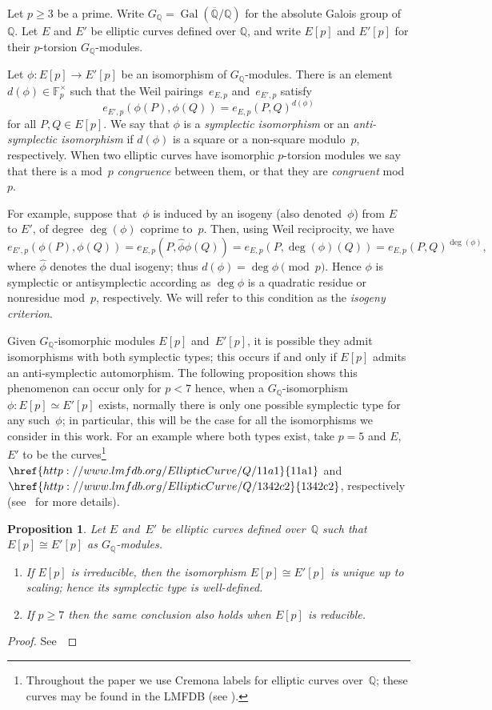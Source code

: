 \documentclass[12pt]{amsart}
\newcommand{\lmfdbec}[3]{\href{http://www.lmfdb.org/EllipticCurve/Q/#1#2#3}{{\text{\rm#1#2#3}}}}
\newcommand{\F}{\mathbb{F}}
\newcommand{\Q}{\mathbb{Q}}
\newcommand{\Qbar}{{\overline{\Q}}}
\DeclareMathOperator{\Gal}{Gal}
\numberwithin{equation}{section}
\newtheorem{proposition}[theorem]{Proposition}
\theoremstyle{definition}
\theoremstyle{remark}
\begin{document}
Let $p \geq 3$ be a prime. Write $G_\Q = \Gal(\Qbar/\Q)$ for the
absolute Galois group of $\Q$.  Let $E$ and $E'$ be elliptic curves defined over $\Q$, and write $E[p]$ and $E'[p]$ for their $p$-torsion $G_\Q$-modules.

Let $\phi : E[p] \to E'[p]$ be an isomorphism of $G_\Q$-modules.
There is an element $d(\phi) \in \F_p^\times$ such that the Weil 
pairings~$e_{E,p}$ and~$e_{E',p}$ satisfy
\[
e_{E',p}(\phi(P), \phi(Q)) = e_{E,p}(P, Q)^{d(\phi)}
\]
for all $P, Q \in E[p]$.  We say that $\phi$ is a {\em symplectic
  isomorphism} or an {\em anti-symplectic isomorphism} if $d(\phi)$ is
a square or a non-square modulo~$p$, respectively.  When two elliptic
curves have isomorphic $p$-torsion modules we say that there is a
mod~$p$ {\em congruence} between them, or that they are {\em
  congruent} mod~$p$.

For example, suppose that~$\phi$ is induced by an isogeny (also
denoted~$\phi$) from $E$ to $E'$, of degree $\deg(\phi)$ coprime
to~$p$. Then, using Weil reciprocity, 
we have 
\[
  e_{E',p}(\phi(P), \phi(Q)) = e_{E,p}(P, \hat\phi\phi(Q)) =
  e_{E,p}(P, \deg(\phi)(Q)) = e_{E,p}(P, Q)^{\deg(\phi)},
  \]
  where $\hat{\phi}$ denotes the dual isogeny; 
  thus $d(\phi)=\deg\phi\pmod{p}$.
  Hence $\phi$ is symplectic or antisymplectic according as $\deg\phi$
is a quadratic residue or nonresidue mod~$p$, respectively.  We will refer to
this condition as the \emph{isogeny criterion}.

Given $G_\Q$-isomorphic modules $E[p]$ and~$E'[p]$, it is possible
they admit isomorphisms with both symplectic types; this occurs if and only if $E[p]$ admits an anti-symplectic automorphism. 
The following proposition shows this phenomenon can occur only 
for $p < 7$ hence, when a $G_\Q$-isomorphism $\phi : E[p] \simeq E'[p]$ exists, normally there is only one possible symplectic type for any such~$\phi$; in particular, this will be the case for all the isomorphisms we consider in this work. 
For an example where both types exist, take $p=5$ and
$E$, $E'$ to be the curves\footnote{Throughout the paper we use
Cremona labels for elliptic curves over~$\Q$; these curves may be
found in the LMFDB (see \cite{lmfdb}).} $\lmfdbec{11}{a}{1}$ and
$\lmfdbec{1342}{c}{2}$, respectively (see~\cite[Example~5.2]{FKSym}
for more details).

\begin{proposition}\label{P:auto}
  Let $E$ and~$E'$ be elliptic curves defined over~$\Q$ such that
  $E[p]\cong E'[p]$ as $G_\Q$-modules.
  \begin{enumerate}
    \item If $E[p]$ is irreducible, then the isomorphism $E[p]\cong
      E'[p]$ is unique up to scaling; hence its symplectic type is
      well-defined.
      \item If $p\ge7$ then the same conclusion also holds when
        $E[p]$ is reducible.
  \end{enumerate}
\end{proposition}
\begin{proof} See~\cite[Corollary~3 and Proposition~2]{FKSym}
\end{proof}
\end{document}
